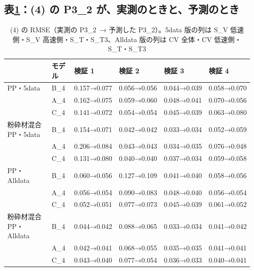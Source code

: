 \documentclass[paper=a4paper,fontsize=10.5pt,line_length=44zw,number_of_lines=38]{jlreq}
\newcommand{\PII}{P3\_2}
\begin{document}
\subsection{表\ref{tab:p32}：(4) の P3\_2 が、実測のときと、予測のとき}
\begin{table}[H]
\caption{(4) の RMSE（実測の \PII\ → 予測した \PII）。5data 版の列は S\_V 低速側・S\_V 高速側・S\_T・S\_T3、Alldata 版の列は CV 全体・CV 低速側・S\_T・S\_T3}\label{tab:p32}
\footnotesize
\begin{tabularx}{\linewidth}{@{}llXXXX@{}}
\toprule
 & モデル & 検証 1 & 検証 2 & 検証 3 & 検証 4 \\
\midrule
PP・5data & B\_4 & 0.157→0.077 & 0.056→0.056 & 0.044→0.039 & 0.058→0.070 \\
 & A\_4 & 0.162→0.075 & 0.059→0.060 & 0.048→0.041 & 0.070→0.056 \\
 & C\_4 & 0.141→0.072 & 0.054→0.054 & 0.045→0.039 & 0.063→0.080 \\
粉砕材混合 PP・5data & B\_4 & 0.154→0.071 & 0.042→0.042 & 0.033→0.034 & 0.052→0.059 \\
 & A\_4 & 0.206→0.084 & 0.043→0.043 & 0.034→0.035 & 0.076→0.048 \\
 & C\_4 & 0.131→0.080 & 0.040→0.040 & 0.037→0.034 & 0.059→0.058 \\
\midrule
PP・Alldata & B\_4 & 0.060→0.056 & 0.127→0.109 & 0.041→0.040 & 0.058→0.056 \\
 & A\_4 & 0.056→0.054 & 0.090→0.083 & 0.048→0.040 & 0.056→0.054 \\
 & C\_4 & 0.052→0.051 & 0.077→0.073 & 0.045→0.039 & 0.061→0.052 \\
粉砕材混合 PP・Alldata & B\_4 & 0.044→0.042 & 0.088→0.065 & 0.033→0.034 & 0.041→0.042 \\
 & A\_4 & 0.042→0.041 & 0.068→0.055 & 0.035→0.035 & 0.041→0.041 \\
 & C\_4 & 0.043→0.040 & 0.077→0.054 & 0.036→0.033 & 0.040→0.041 \\

\bottomrule
\end{tabularx}
\end{table}
\end{document}
